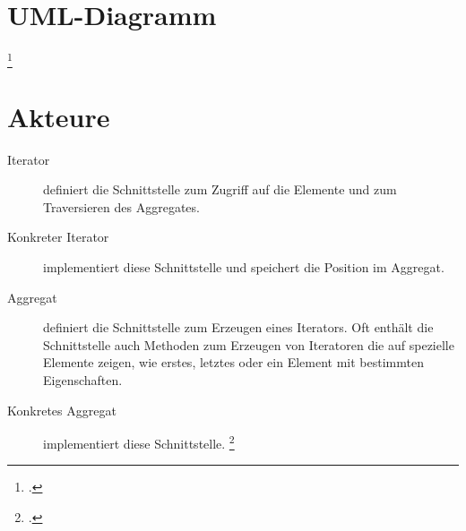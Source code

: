 \documentclass{bschlangaul-theorie}
\begin{document}
\section{UML-Diagramm}

\footcite{wiki:iterator}

%

\section{Akteure}

\begin{description}
\item[Iterator] definiert die Schnittstelle zum Zugriff auf die Elemente
und zum Traversieren des Aggregates.

\item[Konkreter Iterator] implementiert diese Schnittstelle und
speichert die Position im Aggregat.

\item[Aggregat] definiert die Schnittstelle zum Erzeugen eines
Iterators. Oft enthält die Schnittstelle auch Methoden zum Erzeugen von
Iteratoren die auf spezielle Elemente zeigen, wie \zB erstes, letztes
oder ein Element mit bestimmten Eigenschaften.

\item[Konkretes Aggregat] implementiert diese Schnittstelle.
\footcite{wiki:iterator}
\end{description}

\literatur
\end{document}

